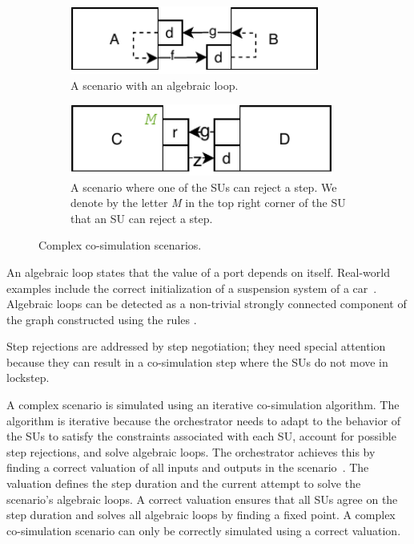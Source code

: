 \begin{figure}[htb]
  \begin{subfigure}{0.48\textwidth}
    \centering
    \centering
    \includegraphics[width=0.9\textwidth]{images/scenario_algebraic.pdf}
    \caption{A scenario with an algebraic loop.}
    \label{fig:algebraic_example}
  \end{subfigure}
  \begin{subfigure}{.48\textwidth}
    \centering
    \includegraphics[width=0.95\textwidth]{images/step_negotiation_scenario.pdf}
    \caption{A scenario where one of the SUs can reject a step. We denote by the letter \emph{M} in the top right corner of the SU that an SU can reject a step.}
    \label{fig:step_finding_scenario}
    \end{subfigure} 
    \caption{Complex co-simulation scenarios.}
  \end{figure}

An algebraic loop states that the value of a port depends on itself. 
Real-world examples include the correct initialization of a suspension system of a car~\cite{thranefmi-based2020}.
Algebraic loops can be detected as a non-trivial strongly connected component of the graph constructed using the rules \cite[Definition 15]{Gomes2019c}.

Step rejections are addressed by step negotiation; they need special attention because they can result in a co-simulation step where the SUs do not move in lockstep.

A complex scenario is simulated using an iterative co-simulation algorithm.
The algorithm is iterative because the orchestrator needs to adapt to the behavior of the SUs to satisfy the constraints associated with each SU, account for possible step rejections, and solve algebraic loops. 
The orchestrator achieves this by finding a correct valuation of all inputs and outputs in the scenario~\cite{thrane2021}.
The valuation defines the step duration and the current attempt to solve the scenario's algebraic loops. 
A correct valuation ensures that all SUs agree on the step duration and solves all algebraic loops by finding a fixed point.
A complex co-simulation scenario can only be correctly simulated using a correct valuation.

